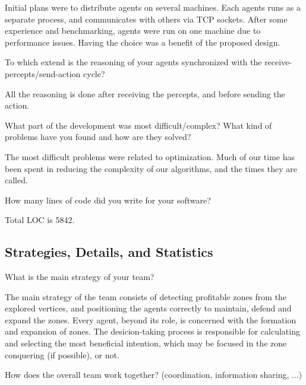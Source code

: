 Initial plans were to distribute agents on several
machines. Each agents runs as a separate process, and communicates with others
via TCP sockets. After some experience and benchmarking, agents were run on one
machine due to performance issues. Having the choice was a benefit of the
proposed design.

\begin{question}
To which extend is the reasoning of your agents synchronized with the
receive-percepts/send-action cycle?
\end{question}

All the reasoning is done after receiving the percepts, and before sending the
action.


\begin{question}
What part of the development was most difficult/complex? What kind of
problems have you found and how are they solved?  
\end{question}

The most difficult problems
were related to optimization. Much of our time has been spent in reducing the
complexity of our algorithms, and the times they are called.

\begin{question}
How many lines of code did you write for your software?  
\end{question}

Total LOC is 5842.

\subsection{Strategies, Details, and Statistics}
\setcounter{question}{0}
\begin{question}
What is the main strategy of your team?
\end{question}

The main strategy of the team consists of detecting profitable zones
from the explored vertices, and positioning the agents correctly to maintain,
defend and expand the zones.
Every agent, beyond its role, is concerned with the formation and expansion of zones.
The desicion-taking process is responsible for calculating and selecting the
most beneficial intention, which may be focused in the zone conquering (if possible),
or not.
    
\begin{question}
How does the overall team work together? (coordination, information
sharing, ...) 
\end{question}

